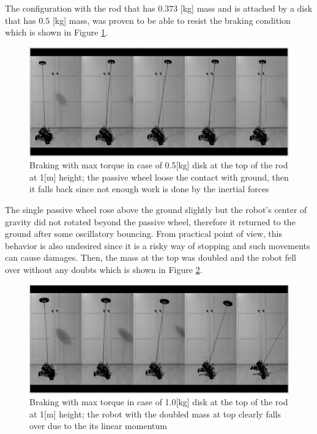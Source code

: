\documentclass[12pt,english,twoside]{article}
\begin{document}
The configuration with the rod that has $0.373$ [kg] mass and is attached by a disk that has $0.5$ [kg] mass, was proven to be able to resist the braking condition which is shown in Figure \ref{fallover_video_05kg}.
\begin{figure}[htb!]
	\centering
	\includegraphics[width=\textwidth]{figures/fallover_video_05kg.png}
	\caption{Braking with max torque in case of 0.5[kg] disk at the top of the rod at 1[m] height; the passive wheel loose the contact with ground, then it falls back since not enough work is done by the inertial forces}
	\label{fallover_video_05kg}
\end{figure}
 The single passive wheel rose above the ground slightly but the robot's center of gravity did not rotated beyond the passive wheel, therefore it returned to the ground after some oscillatory bouncing. From practical point of view, this behavior is also undesired since it is a risky way of stopping and such movements can cause damages. Then, the mass at the top was doubled and the robot fell over without any doubts which is shown in Figure \ref{fallover_video_1kg}. 
 \begin{figure}[htb!]
 	\centering
 	\includegraphics[width=\textwidth]{figures/fallover_video_1kg.png}
 	\caption{Braking with max torque in case of 1.0[kg] disk at the top of the rod at 1[m] height; the robot with the doubled mass at top clearly falls over due to the its linear momentum}
 	\label{fallover_video_1kg}
 \end{figure}
\end{document}

